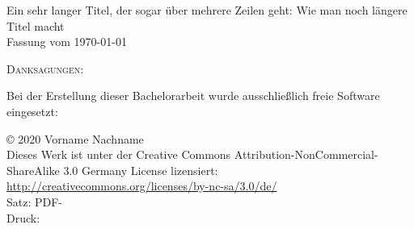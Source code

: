 \documentclass[
    a4paper,
    10pt,
    bibliography=totoc,
    twoside,
    openright,
    numbers=noenddot,
    headings=normal,
    DIV=9,
    parskip
]{scrbook}
\newcommand{\fullname}{Vorname Nachname}
\newcommand{\titel}{Ein sehr langer Titel, der sogar über mehrere Zeilen geht:
Wie man noch längere Titel macht}
\newcommand{\jahr}{2020}
\newcommand{\arbeit}{Bachelorarbeit}
\begin{document}
\clearpage
\thispagestyle{empty}
{
    \small \flushleft \titel\\
    Fassung vom \today
    \vfill

    \textsc{Danksagungen:}
    \vspace{1cm}

    Bei der Erstellung dieser \arbeit{} wurde ausschließlich freie Software eingesetzt: \\
    \begin{figure}[ht]
        \centering
        \hspace{0.5cm}
        \hspace{0.5cm}
        \hspace{0.5cm}
        \hspace{0.5cm}
        \hspace{0.5cm}
        \hspace{0.5cm}
    \end{figure}
    \vspace{1cm}

    \copyright{} \jahr{} \fullname{}\\[0.5em]
    Dieses Werk ist unter der Creative Commons Attribution-NonCommercial-ShareAlike 3.0 Germany License lizensiert: \url{http://creativecommons.org/licenses/by-nc-sa/3.0/de/}\\
    Satz: PDF-\LaTeXe{}\\
    Druck: 
}


\tableofcontents

\mainmatter

\end{document}
